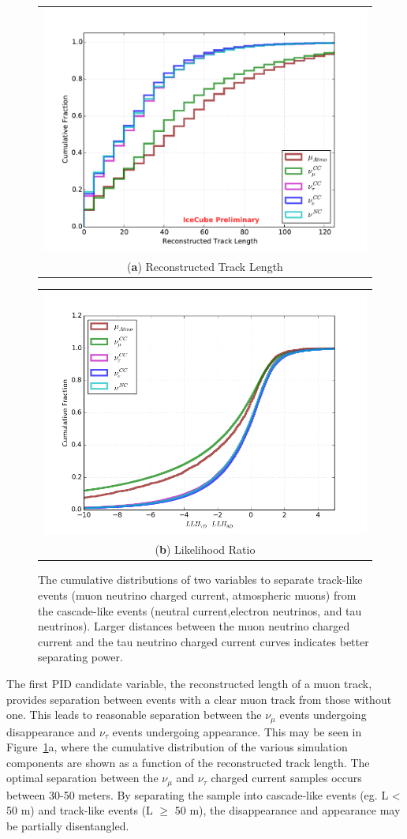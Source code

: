 \begin{figure}[h]
\centering
\begin{tabular}[b]{c}
  \includegraphics[width=0.45\linewidth]{track_length.pdf} \\
  \small (\textbf{\color{ctcolormain}a}) Reconstructed Track Length
\end{tabular} \hspace{2pt}
\begin{tabular}[b]{c}
  \includegraphics[width=0.45\linewidth]{dLLH.png} \\
  \small (\textbf{\color{ctcolormain}b}) Likelihood Ratio
\end{tabular}
\caption[Cumulative distributions of two PID variables in GRECO]{The cumulative distributions of two variables to separate track-like events (muon neutrino charged current, atmospheric muons) from the cascade-like events (neutral current,electron neutrinos, and tau neutrinos). Larger distances between the muon neutrino charged current and the tau neutrino charged current curves indicates better separating power.}
\label{fig:pid_variables}
\end{figure}

The first PID candidate variable, the reconstructed length of a muon track, provides separation between events with a clear muon track from those without one.
This leads to reasonable separation between the $\nu_\mu$ events undergoing disappearance and $\nu_\tau$ events undergoing appearance.
This may be seen in Figure~\ref{fig:pid_variables}a, where the cumulative distribution of the various simulation components are shown as a function of the reconstructed track length.
The optimal separation between the $\nu_\mu$ and $\nu_\tau$ charged current samples occurs between 30-50 meters.
By separating the sample into cascade-like events (eg. L < 50 m) and track-like events (L $\geq$ 50 m), the disappearance and appearance may be partially disentangled.

